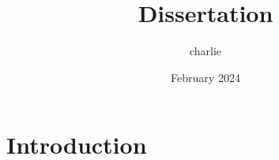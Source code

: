 \documentclass{article}
\title{Dissertation}
\author{charlie }
\date{February 2024}
\begin{document}
\maketitle

\section{Introduction}
\end{document}
